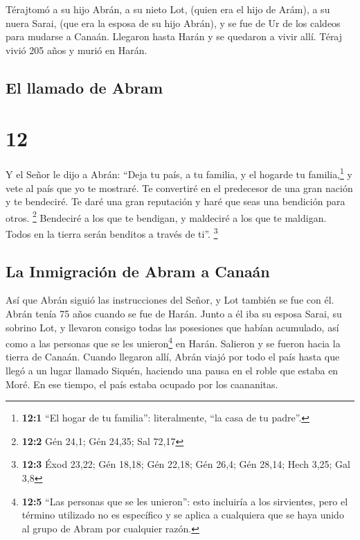  Térajtomó a su hijo Abrán, a su nieto Lot, (quien era el
hijo de Arám), a su nuera Sarai, (que era la esposa de su hijo Abrán), y
se fue de Ur de los caldeos para mudarse a Canaán. Llegaron hasta Harán
y se quedaron a vivir allí.  Téraj vivió 205 años y murió
en Harán.

\hypertarget{el-llamado-de-abram}{%
\subsection{El llamado de Abram}\label{el-llamado-de-abram}}

\hypertarget{section-11}{%
\section{12}\label{section-11}}

 Y el Señor le dijo a Abrán: ``Deja tu país, a tu familia,
y el hogarde tu familia,\footnote{\textbf{12:1} ``El hogar de tu
  familia'': literalmente, ``la casa de tu padre''.} y vete al país que
yo te mostraré.  Te convertiré en el predecesor de una
gran nación y te bendeciré. Te daré una gran reputación y haré que seas
una bendición para otros. \footnote{\textbf{12:2} Gén 24,1; Gén 24,35;
  Sal 72,17}  Bendeciré a los que te bendigan, y maldeciré
a los que te maldigan. Todos en la tierra serán benditos a través de
ti''. \footnote{\textbf{12:3} Éxod 23,22; Gén 18,18; Gén 22,18; Gén
  26,4; Gén 28,14; Hech 3,25; Gal 3,8}

\hypertarget{la-inmigraciuxf3n-de-abram-a-canauxe1n}{%
\subsection{La Inmigración de Abram a
Canaán}\label{la-inmigraciuxf3n-de-abram-a-canauxe1n}}

 Así que Abrán siguió las instrucciones del Señor, y Lot
también se fue con él. Abrán tenía 75 años cuando se fue de Harán.
 Junto a él iba su esposa Sarai, su sobrino Lot, y
llevaron consigo todas las posesiones que habían acumulado, así como a
las personas que se les unieron\footnote{\textbf{12:5} ``Las personas
  que se les unieron'': esto incluiría a los sirvientes, pero el término
  utilizado no es específico y se aplica a cualquiera que se haya unido
  al grupo de Abram por cualquier razón.} en Harán. Salieron y se fueron
hacia la tierra de Canaán. Cuando llegaron allí,  Abrán
viajó por todo el país hasta que llegó a un lugar llamado Siquén,
haciendo una pausa en el roble que estaba en Moré. En ese tiempo, el
país estaba ocupado por los caananitas.

